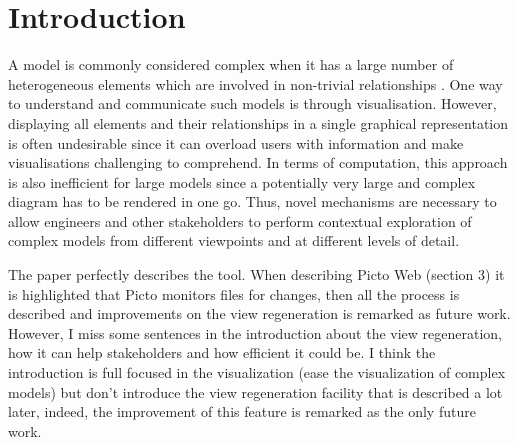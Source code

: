 \documentclass[sigconf,review]{acmart}
\begin{document}


\maketitle

\section{Introduction}
\label{sec:introduction}
A model is commonly considered complex when it has a large number of heterogeneous elements which are involved in non-trivial relationships \cite{boccara2010complex,klosterman2012complex}. One way to understand and communicate such models is through visualisation. However, displaying all elements and their relationships in a single graphical representation is often undesirable since it can overload users with information and make visualisations challenging to comprehend. In terms of computation, this approach is also inefficient for large models since a potentially very large and complex diagram has to be rendered in one go. Thus, novel mechanisms are necessary to allow engineers and other stakeholders to perform contextual exploration of complex models from different viewpoints and at different levels of detail. 

{ \color{blue}
The paper perfectly describes the tool.  When describing Picto Web (section 3) it is highlighted that Picto monitors files for changes,  then all the process is described and improvements on the view regeneration is remarked as future work. 
However,  I miss some sentences in the introduction about the view regeneration,  how it can help stakeholders and how efficient it could be. 
I think the introduction is full focused in the visualization (ease the visualization of complex models) but don't introduce the view regeneration facility that is described a lot later,  indeed,  the improvement of this feature is remarked as the only future work.
}
\end{document}
